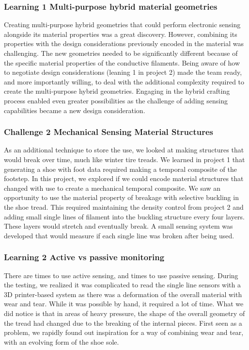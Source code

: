 \subsubsection{Learning 1 Multi-purpose hybrid material geometries}

Creating multi-purpose hybrid geometries that could perform electronic sensing alongside its material properties was a great discovery. However, combining its properties with the design considerations previously encoded in the material was challenging. The new  geometries needed to be significantly different because of the specific material properties of the conductive filaments. Being aware of how to negotiate design considerations (leaning 1 in project 2) made the team ready, and more importantly willing, to deal with the additional complexity required to create the multi-purpose hybrid geometries. Engaging in the hybrid crafting process enabled even greater possibilities as the challenge of adding sensing capabilities became a new design consideration. 


\subsubsection{Challenge 2 Mechanical Sensing Material Structures}

As an additional technique to store the use, we looked at making structures that would break over time, much like winter tire treads. We learned in project 1 that generating a shoe with foot data required making a temporal composite of the footstep. In this project, we explored if we could encode material structures that changed with use to create a mechanical temporal composite. We saw an opportunity to use the material property of breakage with selective buckling \cite{Paulose2015} in the shoe tread. This required maintaining the density control from project 2 and adding small single lines of filament into the buckling structure every four layers. These layers would stretch and eventually break. A small sensing system was developed that would measure if each single line was broken after being used. 

\subsubsection{Learning 2 Active vs passive monitoring}

There are times to use active sensing, and times to use passive sensing. During the testing, we realized it was complicated to read the single line sensors with a 3D printer-based system as there was a deformation of the overall material with wear and tear. While it was possible by hand, it required a lot of time. What we did notice is that in areas of heavy pressure, the shape of the overall geometry of the tread had changed due to the breaking of the internal pieces. First seen as a problem, we rapidly found out inspiration for a way of combining wear and tear, with an evolving form of the shoe sole.

